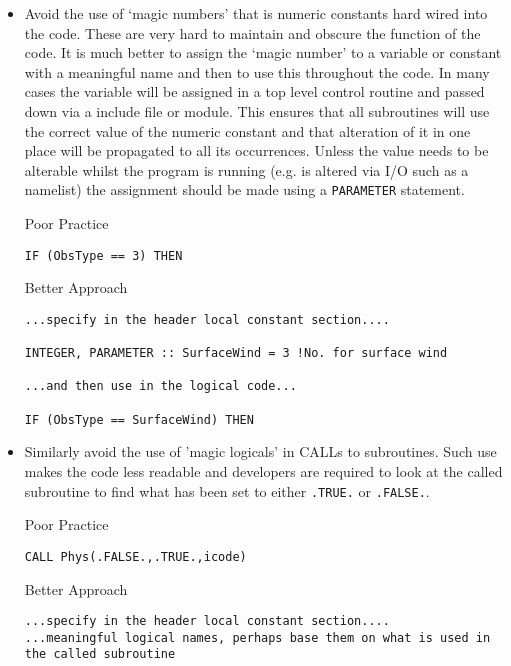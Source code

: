 \begin{itemize}
\item Avoid the use of `magic numbers' that is numeric constants hard wired into the code.
These are very hard to maintain and obscure the function of the code.
It is much better to assign the `magic number' to a variable or constant
with a meaningful name and then to use this throughout the code.
In many cases the variable will be assigned in a top level control routine and
passed down via a include file or module.
This ensures that all subroutines will use the correct value of the
numeric constant and that alteration of it in one place will be
propagated to all its occurrences. Unless the value needs to be alterable
whilst the program is running (e.g. is altered via I/O such as a namelist)
the assignment should be made using a \verb|PARAMETER| statement.

\begin{samepage}
Poor Practice
\begin{verbatim}
IF (ObsType == 3) THEN
\end{verbatim}
\end{samepage}
\pagebreak[0]
\begin{samepage}
Better Approach
\begin{verbatim}
...specify in the header local constant section....

INTEGER, PARAMETER :: SurfaceWind = 3 !No. for surface wind

...and then use in the logical code...

IF (ObsType == SurfaceWind) THEN
\end{verbatim}
\end{samepage}

\item Similarly avoid the use of 'magic logicals' in CALLs to subroutines. Such use
makes the code less readable and developers are required to look at the called
subroutine to find what has been set to either  \verb|.TRUE.| or \verb|.FALSE.|.

\begin{samepage}
Poor Practice
\begin{verbatim}
CALL Phys(.FALSE.,.TRUE.,icode)
\end{verbatim}
\end{samepage}
\begin{samepage}
Better Approach
\begin{verbatim}
...specify in the header local constant section....
...meaningful logical names, perhaps base them on what is used in the called subroutine


\end{verbatim}
\end{samepage}
\end{itemize}
